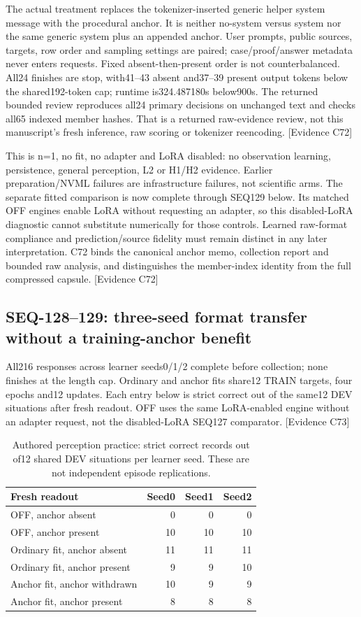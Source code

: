 \documentclass[11pt]{article}
\newcommand{\ev}[1]{\textsf{[Evidence #1]}}
\begin{document}
The actual treatment replaces the tokenizer-inserted generic helper system
message with the procedural anchor. It is neither no-system versus system nor
the same generic system plus an appended anchor. User prompts, public sources,
targets, row order and sampling settings are paired; case/proof/answer metadata
never enters requests. Fixed absent-then-present order is not counterbalanced.
All24 finishes are stop, with41--43 absent and37--39 present output tokens below
the shared192-token cap; runtime is324.487180s below900s. The returned bounded
review reproduces all24 primary decisions on unchanged text and checks all65
indexed member hashes. That is a returned raw-evidence review, not this
manuscript's fresh inference, raw scoring or tokenizer reencoding. \ev{C72}

This is n=1, no fit, no adapter and LoRA disabled: no observation learning,
persistence, general perception, L2 or H1/H2 evidence. Earlier preparation/NVML
failures are infrastructure failures, not scientific arms. The separate fitted
comparison is now complete through SEQ129 below. Its matched OFF engines enable
LoRA without requesting an
adapter, so this disabled-LoRA diagnostic cannot substitute numerically for
those controls. Learned raw-format compliance and prediction/source fidelity
must remain distinct in any later interpretation. C72 binds the canonical
anchor memo, collection report and bounded raw analysis, and distinguishes the
member-index identity from the full compressed capsule. \ev{C72}

\subsection{SEQ-128--129: three-seed format transfer without a training-anchor benefit}
All216 responses across learner seeds0/1/2 complete before collection; none
finishes at the length cap. Ordinary and anchor fits share12 TRAIN targets,
four epochs and12 updates. Each entry below is strict correct out of the same12
DEV situations after fresh readout. OFF uses the same LoRA-enabled engine
without an adapter request, not the disabled-LoRA SEQ127 comparator. \ev{C73}

\begin{table}[ht]
\centering
\caption{Authored perception practice: strict correct records out of12 shared
DEV situations per learner seed. These are not independent episode replications.}
\begin{tabular}{lrrr}
\toprule
Fresh readout & Seed0 & Seed1 & Seed2 \\
\midrule
OFF, anchor absent & 0 & 0 & 0 \\
OFF, anchor present & 10 & 10 & 10 \\
Ordinary fit, anchor absent & 11 & 11 & 11 \\
Ordinary fit, anchor present & 9 & 9 & 10 \\
Anchor fit, anchor withdrawn & 10 & 9 & 9 \\
Anchor fit, anchor present & 8 & 8 & 8 \\
\bottomrule
\end{tabular}
\end{table}
\end{document}
